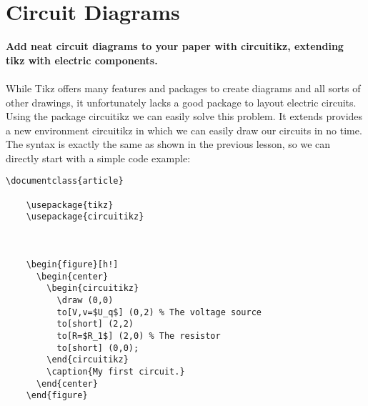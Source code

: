 
\maketitle
\newpage
\section{Circuit Diagrams}
  \textbf{
    Add neat circuit diagrams to your paper with circuitikz, extending tikz with electric components.
  }

  \paragraph{}
  While Tikz offers many features and packages to create diagrams and all sorts of other drawings, it unfortunately lacks a good package to layout electric circuits. Using the package circuitikz we can easily solve this problem. It extends provides a new environment circuitikz in which we can easily draw our circuits in no time. The syntax is exactly the same as shown in the previous lesson, so we can directly start with a simple code example:

  \begin{lstlisting}[language={[LaTeX]TeX},breaklines=true,frame=single]
    \documentclass{article}

    \usepackage{tikz}
    \usepackage{circuitikz}
    
    
    
    \begin{figure}[h!]
      \begin{center}
        \begin{circuitikz}
          \draw (0,0)
          to[V,v=$U_q$] (0,2) % The voltage source
          to[short] (2,2)
          to[R=$R_1$] (2,0) % The resistor
          to[short] (0,0);
        \end{circuitikz}
        \caption{My first circuit.}
      \end{center}
    \end{figure}
    
    
  \end{lstlisting}

